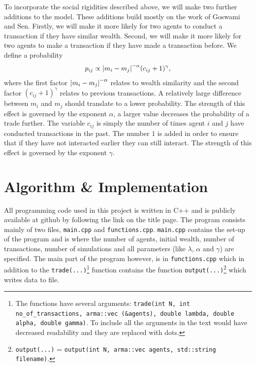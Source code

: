\documentclass[10pt, a4paper]{amsart}
\begin{document}
To incorporate the social rigidities described above, we will make two further additions to the model. These additions build mostly on the work of Goswami and Sen\cite{GoswamiSen}. Firstly, we will make it more likely for two agents to conduct a transaction if they have similar wealth. Second, we will make it more likely for two agents to make a transaction if they have made a transaction before. We define a probability
\begin{equation}
\label{eq:rigidprob}
p_{ij} \propto \abs{m_i - m_j}^{-\alpha}(c_{ij}+1)^{\gamma},
\end{equation}
where the first factor $\abs{m_i-m_j}^{-\alpha}$ relates to wealth similarity and the second factor $(c_{ij}+1)^{\gamma}$ relates to previous transactions. A relatively large difference between $m_i$ and $m_j$ should translate to a lower probability. The strength of this effect is governed by the exponent $\alpha$, a larger value decreases the probability of a trade further. The variable $c_{ij}$ is simply the number of times agent $i$ and $j$ have conducted transactions in the past. The number $1$ is added in order to ensure that if they have not interacted earlier they can still interact. The strength of this effect is governed by the exponent $\gamma$.


\section{Algorithm \& Implementation}
All programming code used in this project is written in C++ and is publicly available at github by following the link on the title page. The program consists mainly of two files, \lstinline|main.cpp| and \lstinline|functions.cpp|. \lstinline|main.cpp| contains the set-up of the program and is where the number of agents, initial wealth, number of transactions, number of simulations and all parameters (like $\lambda$, $\alpha$ and $\gamma$) are specified. The main part of the program however, is in \lstinline|functions.cpp| which in addition to the \lstinline|trade(...)|\footnote{The functions have several arguments: \lstinline|trade(int N, int no_of_transactions, arma::vec (&agents), double lambda, double alpha, double gamma)|. To include all the arguments in the text would have decreased readability and they are replaced with dots.} function contains the function \lstinline|output(...)|\footnote{\lstinline|output(...)| = \lstinline|output(int N, arma::vec agents, std::string filename)|.} which writes data to file.
\end{document}
